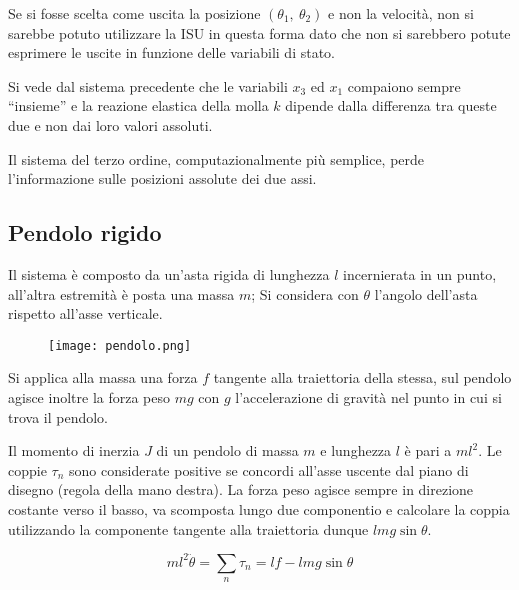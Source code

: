 Se si fosse scelta come uscita la posizione $(\theta_1,\ \theta_2)$ e non la
velocità, non si sarebbe potuto utilizzare la ISU in questa forma dato che non
si sarebbero potute esprimere le uscite in funzione delle variabili di stato.

Si vede dal sistema precedente che le variabili $x_3$ ed $x_1$ compaiono sempre
``insieme'' e la reazione elastica della molla $k$ dipende dalla differenza tra
queste due e non dai loro valori assoluti.

Il sistema del terzo ordine, computazionalmente più semplice, perde
l'informazione sulle posizioni assolute dei due assi.

\newpage
\subsection{Pendolo rigido}
Il sistema è composto da un'asta rigida di lunghezza $l$ incernierata in un
punto, all'altra estremità è posta una massa $m$;
Si considera con $\theta$ l'angolo dell'asta rispetto all'asse verticale.
\begin{figure}[h]
 \centering
 \texttt{[image: pendolo.png]}
 \label{Fig.:pendolo_semplice}
\end{figure}

Si applica alla massa una forza $f$ tangente alla traiettoria della stessa, sul
pendolo agisce inoltre la forza peso $mg$ con $g$ l'accelerazione di gravità
nel punto in cui si trova il pendolo.

Il momento di inerzia $J$ di un pendolo di massa $m$ e lunghezza $l$ è pari a
$ml^2$.
Le coppie $\tau_n$ sono considerate positive se concordi all'asse uscente dal
piano di disegno (regola della mano destra).
La forza peso agisce sempre in direzione costante verso il basso, va scomposta
lungo due componentio e calcolare la coppia utilizzando la componente tangente
alla traiettoria dunque $lmg\sin\theta$.

$$
ml^2\ddot\theta = \sum_n{\tau_n} = lf - lmg\sin\theta
$$
